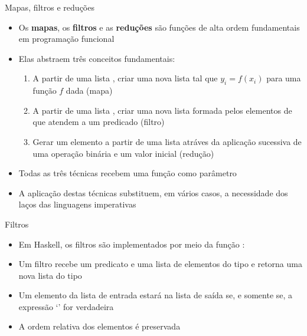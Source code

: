 \begin{frame}[fragile]{Mapas, filtros e reduções}

    \begin{itemize}
        \item Os \textbf{mapas}, os \textbf{filtros} e as \textbf{reduções} são funções de alta 
            ordem fundamentais em programação funcional

        \item Elas abstraem três conceitos fundamentais:
        \begin{enumerate}
            \item A partir de uma lista , criar uma nova lista 
                tal que $y_i = f(x_i)$ para uma função $f$ dada (mapa)

            \item A partir de uma lista , criar uma nova lista 
                formada pelos elementos  de  que atendem a um
                predicado  (filtro)

            \item Gerar um elemento  a partir de uma lista 
                atráves da aplicação sucessiva de uma operação binária  e um
                valor inicial  (redução)
        \end{enumerate}

        \item Todas as três técnicas recebem uma função como parâmetro

        \item A aplicação destas técnicas substituem, em vários casos, a necessidade dos laços das
            linguagens imperativas
    \end{itemize}

\end{frame}

\begin{frame}[fragile]{Filtros}

    \begin{itemize}
        \item Em Haskell, os filtros são implementados por meio da função :


        \item Um filtro recebe um predicato  e uma lista de elementos do tipo
             e retorna uma nova lista do tipo 

        \item Um elemento  da lista de entrada estará na lista de saída
            se, e somente se, a expressão `' for verdadeira

        \item A ordem relativa dos elementos é preservada

    \end{itemize}

\end{frame}
